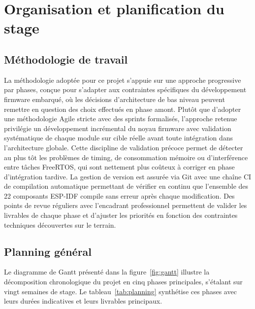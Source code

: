 \section{Organisation et planification du stage}
\label{sec:organisation}

\subsection{Méthodologie de travail}
\label{subsec:methodo}

La méthodologie adoptée pour ce projet s'appuie sur une approche
progressive par phases, conçue pour s'adapter aux contraintes
spécifiques du développement firmware embarqué, où les décisions
d'architecture de bas niveau peuvent remettre en question des choix
effectués en phase amont. Plutôt que d'adopter une méthodologie Agile
stricte avec des sprints formalisés, l'approche retenue privilégie un
développement incrémental du noyau firmware avec validation
systématique de chaque module sur cible réelle avant toute intégration
dans l'architecture globale. Cette discipline de validation précoce
permet de détecter au plus tôt les problèmes de timing, de consommation
mémoire ou d'interférence entre tâches FreeRTOS, qui sont nettement
plus coûteux à corriger en phase d'intégration tardive. La gestion
de version est assurée via Git avec une chaîne CI de compilation
automatique permettant de vérifier en continu que l'ensemble des
22 composants ESP-IDF compile sans erreur après chaque modification.
Des points de revue réguliers avec l'encadrant professionnel permettent
de valider les livrables de chaque phase et d'ajuster les priorités
en fonction des contraintes techniques découvertes sur le terrain.

\subsection{Planning général}
\label{subsec:planning}

Le diagramme de Gantt présenté dans la figure~\ref{fig:gantt} illustre
la décomposition chronologique du projet en cinq phases principales,
s'étalant sur vingt semaines de stage. Le tableau~\ref{tab:planning}
synthétise ces phases avec leurs durées indicatives et leurs livrables
principaux.

